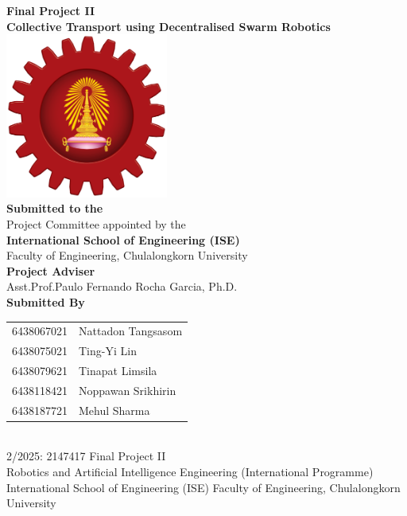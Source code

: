 \begin{titlepage}
    \centering

    {\LARGE \textbf{Final Project II}}\\[1cm]
    {\Huge \textbf{Collective Transport using Decentralised Swarm Robotics}}\\[1cm]

    \includegraphics[width=0.4\textwidth]{assets/images/ise_logo.png}\\[1cm]
    
    \textbf{Submitted to the}\\[0.1cm]
    Project Committee appointed by the\\
    \textbf{International School of Engineering (ISE)}\\
    Faculty of Engineering, Chulalongkorn University\\[1cm]

    \textbf{Project Adviser}\\[0.1cm]
    Asst.Prof.Paulo Fernando Rocha Garcia, Ph.D.\\[1cm]

    \textbf{Submitted By}\\[0.5cm]
    \begin{tabular}{rl}
        6438067021 & Nattadon Tangsasom \\
        6438075021 & Ting-Yi Lin \\
        6438079621 & Tinapat Limsila \\
        6438118421 & Noppawan Srikhirin \\
        6438187721 & Mehul Sharma \\
    \end{tabular}\\[1cm]
    2/2025: 2147417 Final Project II\\
    Robotics and Artificial Intelligence Engineering (International Programme)\\
    International School of Engineering (ISE) Faculty of Engineering, Chulalongkorn University

\end{titlepage}
